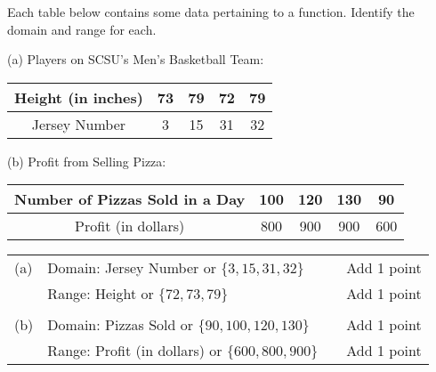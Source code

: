 {
	Each table below contains some data pertaining to a function.  Identify the domain and range for each. 

\noindent (a) Players on SCSU's Men's Basketball Team:

\noindent \begin{tabular}{|c|c|c|c|c|}\hline Height (in inches) & 73&79&72&79\\ \hline Jersey Number& 3&15&31&32\\ \hline
\end{tabular}

\bigskip\noindent (b) Profit from Selling Pizza:

\noindent \begin{tabular}{|c|c|c|c|c|}\hline Number of Pizzas Sold in a Day& 100&120&130&90\\ \hline Profit (in dollars) &800&900&900&600\\ \hline

\end{tabular}}
{\begin{tabular}{llll}
(a) &Domain: Jersey Number or $\{3,15,31,32\}$ &&Add 1 point\\
&Range: Height or $\{72,73,79\}$ &&Add 1 point\\ &&&\\
(b)&Domain: Pizzas Sold or $\{90,100,120,130\}$ &&Add 1 point\\
&Range: Profit (in dollars)  or $\{600,800,900\}$ &&Add 1 point\\ 
\end{tabular}

}

